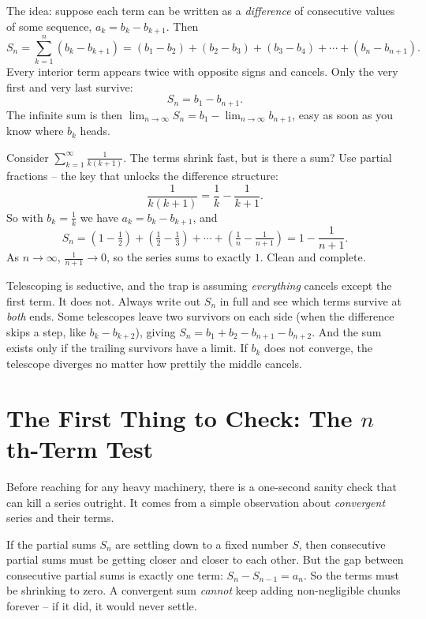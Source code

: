 The idea: suppose each term can be written as a \emph{difference} of consecutive values of some sequence, $a_k = b_k - b_{k+1}$. Then
\[
S_n = \sum_{k=1}^n (b_k - b_{k+1}) = (b_1 - b_2) + (b_2 - b_3) + (b_3 - b_4) + \cdots + (b_n - b_{n+1}).
\]
Every interior term appears twice with opposite signs and cancels. Only the very first and very last survive:
\[
S_n = b_1 - b_{n+1}.
\]
The infinite sum is then $\lim_{n\to\infty} S_n = b_1 - \lim_{n\to\infty} b_{n+1}$, easy as soon as you know where $b_k$ heads.

\begin{example}
Consider $\displaystyle\sum_{k=1}^{\infty} \frac{1}{k(k+1)}$. The terms shrink fast, but is there a sum? Use partial fractions -- the key that unlocks the difference structure:
\[
\frac{1}{k(k+1)} = \frac{1}{k} - \frac{1}{k+1}.
\]
So with $b_k = \tfrac1k$ we have $a_k = b_k - b_{k+1}$, and
\[
S_n = \left(1 - \tfrac12\right) + \left(\tfrac12 - \tfrac13\right) + \cdots + \left(\tfrac1n - \tfrac{1}{n+1}\right) = 1 - \frac{1}{n+1}.
\]
As $n\to\infty$, $\tfrac{1}{n+1}\to 0$, so the series sums to exactly $1$. Clean and complete.
\end{example}

\begin{trapbox}
Telescoping is seductive, and the trap is assuming \emph{everything} cancels except the first term. It does not. Always write out $S_n$ in full and see which terms survive at \emph{both} ends. Some telescopes leave two survivors on each side (when the difference skips a step, like $b_k - b_{k+2}$), giving $S_n = b_1 + b_2 - b_{n+1} - b_{n+2}$. And the sum exists only if the trailing survivors have a limit. If $b_k$ does not converge, the telescope diverges no matter how prettily the middle cancels.
\end{trapbox}

\section{The First Thing to Check: The $n$th-Term Test}
\label{ch29:nth-term}

Before reaching for any heavy machinery, there is a one-second sanity check that can kill a series outright. It comes from a simple observation about \emph{convergent} series and their terms.

\begin{intuitionbox}
If the partial sums $S_n$ are settling down to a fixed number $S$, then consecutive partial sums must be getting closer and closer to each other. But the gap between consecutive partial sums is exactly one term: $S_n - S_{n-1} = a_n$. So the terms must be shrinking to zero. A convergent sum \emph{cannot} keep adding non-negligible chunks forever -- if it did, it would never settle.
\end{intuitionbox}

